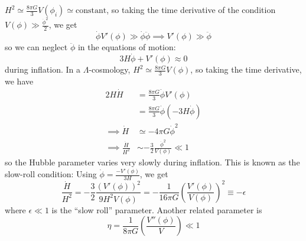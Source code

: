\documentclass[a4paper,twoside,master.tex]{subfiles}
\begin{document}
$ H^2 \simeq \frac{8 \pi G}{3} V(\phi_i) \simeq \text{constant} $, so taking the time derivative of the condition $ V(\phi) \gg \frac{\dot{\phi}^2}{2} $, we get
\begin{equation}
    \dot{\phi} V '(\phi) \gg \dot{\phi} \ddot{\phi} \implies V'(\phi) \gg \ddot{\phi}
\end{equation}
so we can neglect $ \ddot{\phi} $ in the equations of motion:
\begin{equation}
    3H \dot{\phi} + V'(\phi) \approx 0
\end{equation}
during inflation. In a $ \Lambda $-cosmology, $ H^2 \simeq \frac{8 \pi G}{3} V(\phi) $, so taking the time derivative, we have
\begin{align}
    2H \dot{H} &= \frac{8 \pi G}{3} \dot{\phi} V'(\phi) \\
               &= \frac{8 \pi G}{3} \dot{\phi} (-3H \dot{\phi}) \\
    \implies \dot{H} &\simeq -4 \pi G \dot{\phi}^2 \\
    \implies \frac{\dot{H}}{H^2} &\sim - \frac{3}{2} \frac{\dot{\phi}^2}{V(\phi)} \ll 1
\end{align}
so the Hubble parameter varies very slowly during inflation. This is known as the slow-roll condition: Using $ \dot{\phi} = \frac{-V'(\phi)}{3H} $, we get
\begin{equation}
    \frac{\dot{H}}{H^2} = - \frac{3}{2} \frac{(V'(\phi))^2}{9H^2 V(\phi)} = - \frac{1}{16 \pi G} \left( \frac{V'(\phi)}{V(\phi)} \right)^2 \equiv - \epsilon
\end{equation}
where $ \epsilon \ll 1 $ is the ``slow roll'' parameter. Another related parameter is
\begin{equation}
    \eta = \frac{1}{8 \pi G} \left( \frac{V''(\phi)}{V} \right) \ll 1
\end{equation}
\end{document}
